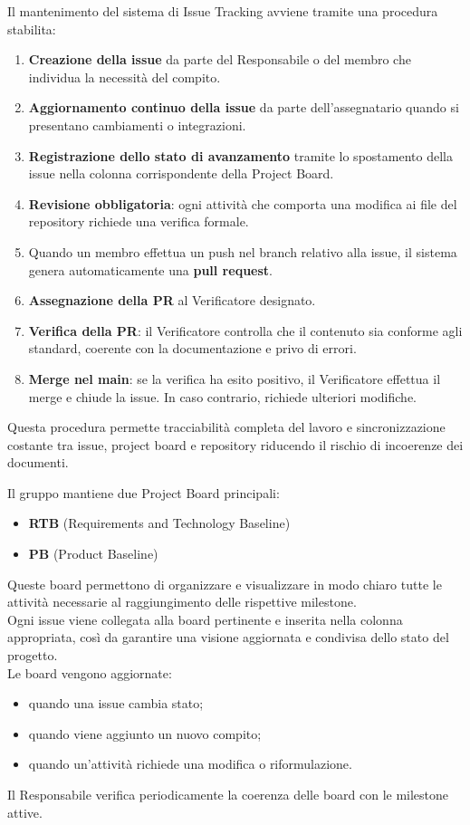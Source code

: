 Il mantenimento del sistema di Issue Tracking avviene tramite una procedura stabilita:
\begin{enumerate}[itemsep=3pt, parsep=1pt, leftmargin=*]
    \item \textbf{Creazione della issue} da parte del Responsabile o del membro che individua la necessità del compito.
    \item \textbf{Aggiornamento continuo della issue} da parte dell’assegnatario quando si presentano cambiamenti o integrazioni.
    \item \textbf{Registrazione dello stato di avanzamento} tramite lo spostamento della issue nella colonna corrispondente della Project Board.
    \item \textbf{Revisione obbligatoria}: ogni attività che comporta una modifica ai file del repository richiede una verifica formale.
    \item Quando un membro effettua un push nel branch relativo alla issue, il sistema genera automaticamente una \textbf{pull request}.
    \item \textbf{Assegnazione della PR} al Verificatore designato.
    \item \textbf{Verifica della PR}: il Verificatore controlla che il contenuto sia conforme agli standard, coerente con la documentazione e privo di errori.
    \item \textbf{Merge nel main}: se la verifica ha esito positivo, il Verificatore effettua il merge e chiude la issue. In caso contrario, richiede ulteriori modifiche.
\end{enumerate}
Questa procedura permette tracciabilità completa del lavoro e sincronizzazione costante tra issue, project board e repository riducendo il rischio di incoerenze dei documenti.

Il gruppo mantiene due Project Board principali:
\begin{itemize}[itemsep=3pt, parsep=1pt, label=$\scriptstyle\bullet$]
    \item \textbf{RTB} (Requirements and Technology Baseline)
    \item \textbf{PB} (Product Baseline)
\end{itemize}
Queste board permettono di organizzare e visualizzare in modo chiaro tutte le attività necessarie al raggiungimento delle rispettive milestone.\\
Ogni issue viene collegata alla board pertinente e inserita nella colonna appropriata, così da garantire una visione aggiornata e condivisa dello stato del progetto.\\
Le board vengono aggiornate:
\begin{itemize}[itemsep=3pt, parsep=1pt, label=$\scriptstyle\bullet$]
    \item quando una issue cambia stato;
    \item quando viene aggiunto un nuovo compito;
    \item quando un’attività richiede una modifica o riformulazione.
\end{itemize}
Il Responsabile verifica periodicamente la coerenza delle board con le milestone attive.

